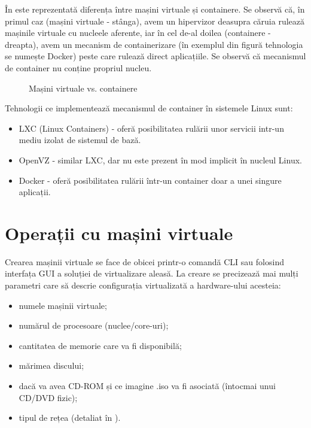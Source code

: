 În  este reprezentată diferența între mașini virtuale și containere.
Se observă că, în primul caz (mașini virtuale - stânga), avem un hipervizor deasupra căruia rulează mașinile virtuale cu nucleele aferente, iar în cel de-al doilea (containere - dreapta), avem un mecanism de containerizare (în exemplul din figură tehnologia se numește Docker) peste care rulează direct aplicațiile.
Se observă că mecanismul de container nu conține propriul nucleu.

\begin{figure}[htbp]
  \centering
  \def\svgwidth{\columnwidth}
  
  \caption{Mașini virtuale vs. containere}
  \label{fig:vm:vm-container}
\end{figure}

Tehnologii ce implementează mecanismul de container în sistemele Linux sunt:

\begin{itemize}
  \item LXC  (Linux Containers) - oferă posibilitatea rulării unor servicii intr-un mediu izolat de sistemul de bază.
  \item OpenVZ - similar LXC, dar nu este prezent în mod implicit în nucleul Linux.
  \item Docker - oferă posibilitatea rulării într-un container doar a unei singure aplicații.
\end{itemize}

\section{Operații cu mașini virtuale}
\label{sec:vm:ops}

Crearea mașinii virtuale se face de obicei printr-o comandă CLI sau folosind interfața GUI a soluției de virtualizare aleasă.
La creare se precizează mai mulți parametri care să descrie configurația virtualizată a hardware-ului acesteia:

\begin{itemize}
  \item numele mașinii virtuale;
  \item numărul de procesoare (nuclee/core-uri);
  \item cantitatea de memorie care va fi disponibilă;
  \item mărimea discului;
  \item dacă va avea CD-ROM și ce imagine .iso va fi asociată (întocmai unui CD/DVD fizic);
  \item tipul de rețea (detaliat în ).
\end{itemize}


